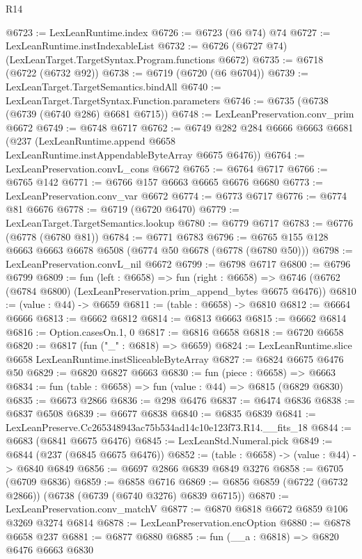 \begin{lexlean}{R14}
\begin{coremodule}
@6723 := LexLeanRuntime.index
@6726 := @6723 (@6 @74) @74
@6727 := LexLeanRuntime.instIndexableList
@6732 := @6726 (@6727 @74) (LexLeanTarget.TargetSyntax.Program.functions @6672)
@6735 := @6718 (@6722 (@6732 @92))
@6738 := @6719 (@6720 (@6 @6704))
@6739 := LexLeanTarget.TargetSemantics.bindAll
@6740 := LexLeanTarget.TargetSyntax.Function.parameters
@6746 := @6735 (@6738 (@6739 (@6740 @286) @6681 @6715))
@6748 := LexLeanPreservation.conv_prim @6672
@6749 := @6748 @6717
@6762 := @6749
    @282
    @284
    @6666
    @6663
    @6681
    (@237 (LexLeanRuntime.append @6658 LexLeanRuntime.instAppendableByteArray @6675 @6476))
@6764 := LexLeanPreservation.convL_cons @6672
@6765 := @6764 @6717
@6766 := @6765 @142
@6771 := @6766 @157 @6663 @6665 @6676 @6680
@6773 := LexLeanPreservation.conv_var @6672
@6774 := @6773 @6717
@6776 := @6774 @81 @6676
@6778 := @6719 (@6720 @6470)
@6779 := LexLeanTarget.TargetSemantics.lookup
@6780 := @6779 @6717
@6783 := @6776 (@6778 (@6780 @81))
@6784 := @6771 @6783
@6796 := @6765 @155 @128 @6663 @6663 @6678 @6508 (@6774 @50 @6678 (@6778 (@6780 @50)))
@6798 := LexLeanPreservation.convL_nil @6672
@6799 := @6798 @6717
@6800 := @6796 @6799
@6809 := fun (left : @6658) =>
  fun (right : @6658) =>
  @6746 (@6762 (@6784 @6800) (LexLeanPreservation.prim_append_bytes @6675 @6476))
@6810 := (value : @44) -> @6659
@6811 := (table : @6658) -> @6810
@6812 := @6664 @6666
@6813 := @6662 @6812
@6814 := @6813 @6663
@6815 := @6662 @6814
@6816 := Option.casesOn.{1, 0}
@6817 := @6816 @6658
@6818 := @6720 @6658
@6820 := @6817 (fun ("_" : @6818) => @6659)
@6824 := LexLeanRuntime.slice @6658 LexLeanRuntime.instSliceableByteArray
@6827 := @6824 @6675 @6476 @50
@6829 := @6820 @6827 @6663
@6830 := fun (piece : @6658) => @6663
@6834 := fun (table : @6658) => fun (value : @44) => @6815 (@6829 @6830)
@6835 := @6673 @2866
@6836 := @298 @6476
@6837 := @6474 @6836
@6838 := @6837 @6508
@6839 := @6677 @6838
@6840 := @6835 @6839
@6841 := LexLeanPreserve.Cc265348943ac75b534ad14c10e123f73.R14.__fits_18
@6844 := @6683 (@6841 @6675 @6476)
@6845 := LexLeanStd.Numeral.pick
@6849 := @6844 (@237 (@6845 @6675 @6476))
@6852 := (table : @6658) -> (value : @44) -> @6840 @6849
@6856 := @6697 @2866 @6839 @6849 @3276
@6858 := @6705 (@6709 @6836)
@6859 := @6858 @6716
@6869 := @6856 @6859 (@6722 (@6732 @2866)) (@6738 (@6739 (@6740 @3276) @6839 @6715))
@6870 := LexLeanPreservation.conv_matchV
@6877 := @6870 @6818 @6672 @6859 @106 @3269 @3274 @6814
@6878 := LexLeanPreservation.encOption
@6880 := @6878 @6658 @237
@6881 := @6877 @6880
@6885 := fun (__a : @6818) => @6820 @6476 @6663 @6830

\end{coremodule}
\end{lexlean}
